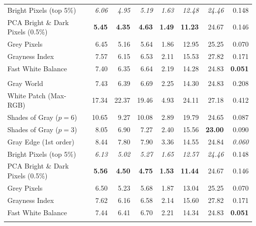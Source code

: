 \begin{longtable}{@{}>{\raggedright\arraybackslash}p{6.8cm}rrrrrrr@{}}
Bright Pixels (top 5\%)~\cite{bright_pixels} & \textit{6.06} & \textit{4.95} & \textit{5.19} & \textit{1.63} & \textit{12.48} & \textit{24.46} & 0.148 \\
PCA Bright \& Dark Pixels (0.5\%)~\cite{cheng2014illuminant} & \textbf{5.45} & \textbf{4.35} & \textbf{4.63} & \textbf{1.49} & \textbf{11.23} & 24.67 & 0.146 \\
Grey Pixels~\cite{yangGrayPixels} & 6.45 & 5.16 & 5.64 & 1.86 & 12.95 & 25.25 & 0.070 \\
Grayness Index~\cite{qianFindingGrayPixels} & 7.57 & 6.15 & 6.53 & 2.11 & 15.53 & 27.82 & 0.171 \\
Fast White Balance~\cite{fast_wb_greyness} & 7.40 & 6.35 & 6.64 & 2.19 & 14.28 & 24.83 & \textbf{0.051} \\
\midrule
\multicolumn{8}{@{}l}{\textbf{NUS 8-Camera (extended)~\cite{cheng2014illuminant} ($N=1853$)}} \\
\midrule
Gray World~\cite{gray_world} & 7.43 & 6.39 & 6.69 & 2.25 & 14.30 & 24.83 & 0.208 \\
White Patch (Max-RGB)~\cite{white_patch} & 17.34 & 22.37 & 19.46 & 4.93 & 24.11 & 27.18 & 0.412 \\
Shades of Gray ($p=6$)~\cite{shades_of_gray} & 10.65 & 9.27 & 10.08 & 2.89 & 19.79 & 24.65 & 0.087 \\
Shades of Gray ($p=3$)~\cite{shades_of_gray} & 8.05 & 6.90 & 7.27 & 2.40 & 15.56 & \textbf{23.00} & 0.090 \\
Gray Edge (1st order)~\cite{gray_edge} & 8.44 & 7.80 & 7.90 & 3.36 & 14.55 & 24.84 & \textit{0.060} \\
Bright Pixels (top 5\%)~\cite{bright_pixels} & \textit{6.13} & \textit{5.02} & \textit{5.27} & \textit{1.65} & \textit{12.57} & \textit{24.46} & 0.148 \\
PCA Bright \& Dark Pixels (0.5\%)~\cite{cheng2014illuminant} & \textbf{5.56} & \textbf{4.50} & \textbf{4.75} & \textbf{1.53} & \textbf{11.44} & 24.67 & 0.146 \\
Grey Pixels~\cite{yangGrayPixels} & 6.50 & 5.23 & 5.68 & 1.87 & 13.04 & 25.25 & 0.070 \\
Grayness Index~\cite{qianFindingGrayPixels} & 7.62 & 6.16 & 6.58 & 2.14 & 15.60 & 27.82 & 0.171 \\
Fast White Balance~\cite{fast_wb_greyness} & 7.44 & 6.41 & 6.70 & 2.21 & 14.34 & 24.83 & \textbf{0.051} \\
\midrule
\multicolumn{8}{@{}l}{\textbf{LSMI~\cite{kim2021lsmi} ($N=3396$)}} \\
\midrule

\end{longtable}
